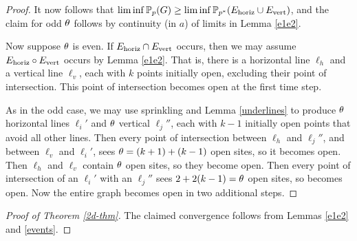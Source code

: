 \begin{proof}
It now follows that $\liminf \mathbb{P}_p(G)\ge \liminf\mathbb{P}_{p^*}(E_{\text{horiz}} \cup E_{\text{vert}})$, 
and the claim for odd $\theta$ follows by continuity (in $a$) of limits in Lemma \ref{e1e2}.

Now suppose  $\theta$ is even. If $E_{\text{horiz}} \cap E_{\text{vert}}$ occurs, then 
we may assume $E_{\text{horiz}} \circ E_{\text{vert}}$ occurs by Lemma \ref{e1e2}.
That is, there is a horizontal line $\ell_h$ and a vertical line $\ell_v$, 
each with $k$ points initially open, excluding their point of intersection.
This point of intersection becomes open at the first time step. 

As in the odd case, we may use sprinkling and Lemma \ref{underlines} to produce
$\theta$ horizontal lines $\ell_i'$ and $\theta$ vertical 
$\ell_j''$, each with $k-1$ initially
open points that avoid all other lines.
Then every point of intersection between $\ell_h$ and $\ell_j''$, and between $\ell_v$ and 
$\ell_i'$, sees $\theta = (k+1)+(k-1)$ open sites, so it becomes open.
Then $\ell_h$ and $\ell_v$ contain $\theta$ open sites, so they become open.
Then every point of intersection of an $\ell_i'$ with an $\ell_j''$ sees 
$2 + 2(k-1) = \theta$ open sites, so becomes open. Now
the entire graph becomes open in two additional steps.
\end{proof}

\begin{comment}
\begin{theorem}
Let $\threshold \ge 3$, $p=an^{-1-\frac{1}{k}}$ where $k = \lceil\frac{\threshold}{2}\rceil$. As $n \to \infty$, 
\begin{equation*}
\lim_{n \to \infty}\prob (F)= 
\begin{cases} (1-e^{-a^k/k!})^2 & \text{if $\threshold$ is even,}
\\
1-(e^{-a^k/k!})^2 &\text{if $\threshold$ is odd.}
\end{cases}
\end{equation*}
\end{theorem}
\end{comment}

\begin{proof}[Proof of Theorem \ref{2d-thm}]
The claimed convergence follows from Lemmas \ref{e1e2} and \ref{events}.
\end{proof}

